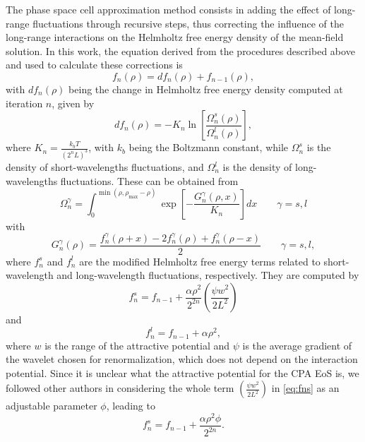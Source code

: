 \documentclass[preprint,12pt,3p]{elsarticle}
\begin{document}
The phase space cell approximation method consists in adding the effect of long-range fluctuations through recursive steps, thus correcting the influence of the long-range interactions on the Helmholtz free energy density of the mean-field solution.
In this work, the equation derived from the procedures described above and used to calculate these corrections is
\begin{equation} \label{eq:fn}
f_{n}(\rho) = df_{n}(\rho) + f_{n-1}(\rho),
\end{equation}
with $df_{n}(\rho)$ being the change in Helmholtz free energy density computed at iteration $n$, given by
\begin{equation} \label{eq:dfn}
df_{n}(\rho) = -K_{n} \ln\left[\frac{\Omega_{n}^{s}(\rho)}{\Omega_{n}^{l}(\rho)}\right],
\end{equation}
where $K_{n} = \frac{k_{b}T}{(2^{n}L)^3}$, with $k_{b}$ being the Boltzmann constant, while
$\Omega_{n}^{s}$ is the density of short-wavelengths fluctuations, and
$\Omega_{n}^{l}$ is the density of long-wavelengths fluctuations.
These can be obtained from
\begin{equation} \label{eq:Omega}
\Omega_{n}^{\gamma} = \int_{0}^{\min(\rho,\rho_{\max}-\rho)}\exp\left[-\frac{G_{n}^{\gamma}(\rho,x)}{K_{n}}\right]dx \qquad  \gamma = s,l
\end{equation}
with
\begin{equation} \label{eq:Gn}
G_{n}^{\gamma}(\rho) = \frac{f_{n}^{\gamma}(\rho+x)-2f_{n}^{\gamma}(\rho)+f_{n}^{\gamma}(\rho-x)}{2} \qquad \gamma = s,l,
\end{equation}
where $f_{n}^{s}$ and $f_{n}^{l}$ are the modified Helmholtz free energy terms related to short-wavelength and long-wavelength fluctuations, respectively.
They are computed by
\begin{equation} \label{eq:fns_battle}
f_{n}^{s} = f_{n-1} + \frac{\alpha \rho^2}{2^{2n}}\left(\frac{\psi w^2}{2L^2}\right)
\end{equation}
and
\begin{equation} \label{eq:fnl}
f_{n}^{l} = f_{n-1} + \alpha\rho^2,
\end{equation}
where $w$ is the range of the attractive potential and $\psi$ is the average gradient of the wavelet chosen for renormalization, which does not depend on the interaction potential.
Since it is unclear what the attractive potential for the CPA EoS is, we followed other authors in considering the whole term $\left(\frac{\psi w^2}{2L^2}\right)$ in \cref{eq:fns} as an adjustable parameter $\phi$, leading to
\begin{equation} \label{eq:fns}
f_{n}^{s} = f_{n-1} + \frac{\alpha \rho^2 \phi}{2^{2n}}.
\end{equation}
\end{document}
